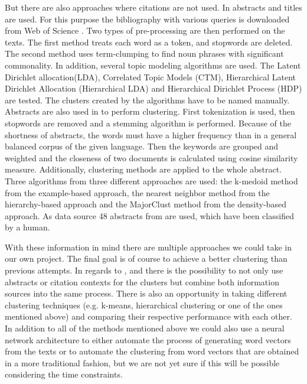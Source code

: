 But there are also approaches where citations are not used.
In \cite{Clustering_scientific_documents_with_topic_modeling} abstracts and titles are used.
For this purpose the bibliography with various queries is downloaded from Web of Science \cite{web_of_science}.  
Two types of pre-processing are then performed on the texts. The first method treats each word as a token, and stopwords are deleted. The second method uses term-clumping to find noun phrases with significant commonality.
In addition, several topic modeling algorithms are used. 
The Latent Dirichlet allocation(LDA), Correlated Topic Models (CTM), Hierarchical Latent Dirichlet Allocation (Hierarchical LDA) and Hierarchical Dirichlet Process (HDP) are tested.
The clusters created by the algorithms have to be named manually.
Abstracts are also used in \cite{An_Approach_to_Clustering_Abstracts} to perform clustering.
First tokenization is used, then stopwords are removed and a stemming algorithm is performed.
Because of the shortness of abstracts, the words must have a higher frequency than in a general balanced corpus of the given language. Then the keywords are grouped and weighted and the closeness of two documents is calculated using cosine similarity measure. 
Additionally, clustering methods are applied to the whole abstract. Three algorithms from three different approaches are used: the k-medoid method from the example-based approach, the nearest neighbor method from the hierarchy-based approach and the MajorClust method from the density-based approach.
As data source 48 abstracts from \cite{cicling} are used, which have been classified by a human.

With these information in mind there are multiple approaches we could take in our own project. The final goal is of course to achieve a better clustering than previous attempts.
In regards to \cite{An_Approach_to_Clustering_Abstracts}, \cite{Document_clustering_of_scientific_texts_using_citation_contexts} and \cite{Clustering_scientific_documents_with_topic_modeling} there is the possibility to not only use abstracts or citation contexts for the clusters but combine both information sources into the same process.
There is also an opportunity in taking different clustering techniques (e.g. k-means, hierarchical clustering or one of the ones mentioned above) and comparing their respective performance with each other.
In addition to all of the methods mentioned above we could also use a neural network architecture to either automate the process of generating word vectors from the texts or to automate the clustering from word vectors that are obtained in a more traditional fashion, but we are not yet sure if this will be possible considering the time constraints.
